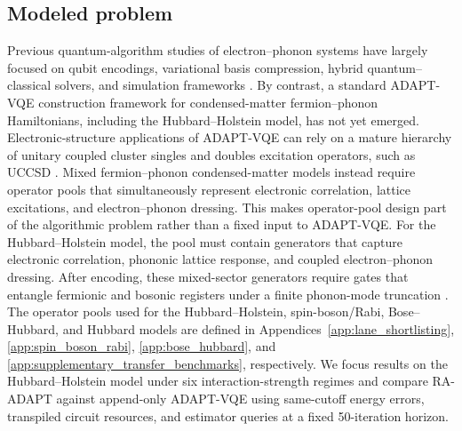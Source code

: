 \documentclass[
  reprint,
  amsmath,
  amssymb,
  aps,
  pra,
  nofootinbib,
  superscriptaddress,
  floatfix
]{revtex4-2}
\begin{document}
\subsection{Modeled problem}
Previous quantum-algorithm studies of electron--phonon systems have largely focused on qubit encodings, variational basis compression, hybrid quantum--classical solvers, and simulation frameworks \cite{Macridin2018,Li2023,Denner2023,Peng2025BosonHamiltonians}. By contrast, a standard ADAPT-VQE construction framework for condensed-matter fermion--phonon Hamiltonians, including the Hubbard--Holstein model, has not yet emerged. Electronic-structure applications of ADAPT-VQE can rely on a mature hierarchy of unitary coupled cluster singles and doubles excitation operators, such as UCCSD \cite{Romero2018UCC,Grimsley2019}. Mixed fermion--phonon condensed-matter models instead require operator pools that simultaneously represent electronic correlation, lattice excitations, and electron--phonon dressing. This makes operator-pool design part of the algorithmic problem rather than a fixed input to ADAPT-VQE. For the Hubbard--Holstein model, the pool must contain generators that capture electronic correlation, phononic lattice response, and coupled electron--phonon dressing. After encoding, these mixed-sector generators require gates that entangle fermionic and bosonic registers under a finite phonon-mode truncation \cite{Hubbard1963,Holstein1959a,Holstein1959b}. The operator pools used for the Hubbard--Holstein, spin-boson/Rabi, Bose--Hubbard, and Hubbard models are defined in Appendices~\ref{app:lane_shortlisting}, \ref{app:spin_boson_rabi}, \ref{app:bose_hubbard}, and \ref{app:supplementary_transfer_benchmarks}, respectively. We focus results on the Hubbard--Holstein model under six interaction-strength regimes and compare RA-ADAPT against append-only ADAPT-VQE using same-cutoff energy errors, transpiled circuit resources, and estimator queries at a fixed 50-iteration horizon.
\end{document}
